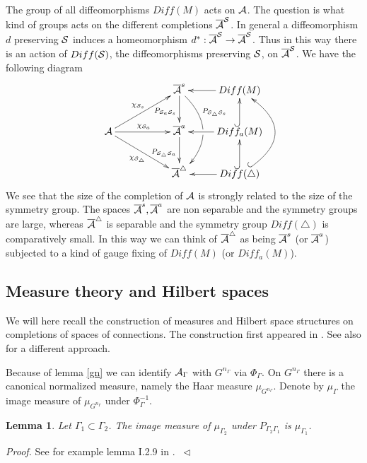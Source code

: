 \documentclass[12pt]{article}
\newcommand{\eproof}{{~\hfill$ \triangleleft$}}
\def\ca{{\cal A}}
\def\cs{{\cal S}}
\newtheorem{lemma}[thm]{Lemma}
\begin{document}
{The group of all diffeomorphisms $Diff (M)$ acts on $\ca$. The question is  what kind of groups  acts on the different completions $\overline{\ca}^\cs$. In general a diffeomorphism $d$ preserving $\cs$ induces a homeomorphism $d^*:\overline{\ca}^\cs \to \overline{\ca}^\cs$. Thus in this way there is an action of $Diff(\cs )$, the diffeomorphisms preserving $\cs$, on  $\overline{\ca}^\cs$. We have the following diagram
$$\hbox{\xymatrix{ & &\overline{\ca}^s \ar[d]_{P_{\cs_a \cs_s}} \ar@/^2pc/[dd]^(0.3){P_{\cs_\triangle \cs_s}} |!{[d];[dr]}\hole& \ar[l] Diff(M)\\
\ca \ar[urr]^{\chi_{\cs_s}} \ar[drr]_{\chi_{\cs_\triangle}} \ar[rr]^{\chi_{\cs_a}}&& \overline{\ca}^a \ar[d]_{P_{\cs_\triangle \cs_a}}& Diff_a(M) \ar[l] \ar@{^{(}->}[u]  \\
&& \overline{\ca}^\triangle & Diff (\triangle )\ar[l]  \ar@{^{(}->}[u] \ar@{^{(}->}@/_3pc/[uu] }}     $$
We see that the size of the completion of $\ca$ is strongly related to the size of the symmetry group. The spaces $\overline{\ca}^s,\overline{\ca}^a$ are non separable and the symmetry groups are large, whereas $\overline{\ca}^\triangle$ is separable and the symmetry group $Diff (\triangle )$ is comparatively small. In this way we can think of $\overline{\ca}^\triangle$ as being $\overline{\ca}^s$ (or $\overline{\ca}^a$) subjected to a kind of gauge fixing of $Diff(M)$ (or $Diff_a (M)$). 


\subsection{Measure theory and Hilbert spaces}
We will here recall the construction of measures and Hilbert space structures on completions of spaces of connections. The construction first appeared in  \cite{AL2}. See also \cite{MM} for a different approach.

Because of lemma \ref{gn} we can identify $\ca_\Gamma$ with $G^{n_\Gamma}$ via $\Phi_\Gamma$. On $G^{n_\Gamma}$ there is a canonical normalized measure, namely the Haar measure $\mu_{G^{n_\Gamma}}$. Denote by $\mu_\Gamma$ the image measure of $\mu_{G^{n_\Gamma}}$ under $\Phi_\Gamma^{-1}$. 

\begin{lemma} \label{maal}
Let $\Gamma_1 \subset \Gamma_2$. The image measure of $\mu_{\Gamma_2}$ under $P_{\Gamma_2\Gamma_1}$ is $\mu_{\Gamma_1}$. 
\end{lemma}  

\textit{Proof.} See for example lemma I.2.9 in \cite{Th1}. \eproof \\

}
\end{document}
